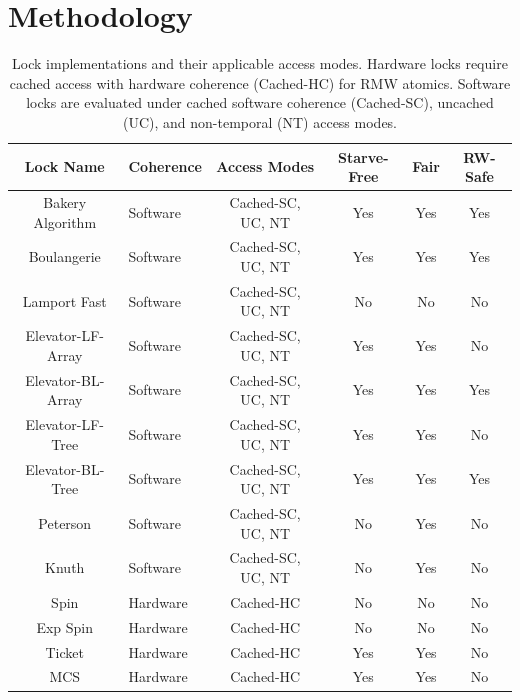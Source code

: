 \section{Methodology}

\begin{table}
    \centering
    \begin{tabular}{clcccc}
        \toprule
         Lock Name & Coherence & Access Modes & Starve-Free & Fair & RW-Safe \\
        \midrule
         Bakery Algorithm\cite{lamportNewSolutionDijkstras1974} & Software & Cached-SC, UC, NT & Yes & Yes & Yes\\
         Boulangerie\cite{mosesHoodBakeryAlgorithm2015} & Software & Cached-SC, UC, NT & Yes & Yes & Yes\\
         Lamport Fast\cite{lamportFastMutualExclusion1987} & Software & Cached-SC, UC, NT & No & No & No\\
         Elevator-LF-Array\cite{buhrHighcontentionMutualExclusion2018} & Software & Cached-SC, UC, NT & Yes & Yes & No\\
         Elevator-BL-Array\cite{buhrHighcontentionMutualExclusion2018} & Software & Cached-SC, UC, NT & Yes & Yes & Yes\\
         Elevator-LF-Tree\cite{buhrHighcontentionMutualExclusion2018} & Software & Cached-SC, UC, NT & Yes & Yes & No\\
         Elevator-BL-Tree\cite{buhrHighcontentionMutualExclusion2018} & Software & Cached-SC, UC, NT & Yes & Yes & Yes\\
         Peterson\cite{petersonMythsMutualExclusion1981} & Software & Cached-SC, UC, NT & No & Yes & No\\
         Knuth\cite{knuthAdditionalCommentsProblem1966} & Software & Cached-SC, UC, NT & No & Yes & No\\
         Spin\cite{andersonPerformanceSpinLock1990} & Hardware & Cached-HC & No & No & No\\
         Exp Spin\cite{andersonPerformanceSpinLock1990} & Hardware & Cached-HC & No & No & No\\
         Ticket\cite{mellor-crummeyAlgorithmsScalableSynchronization1991} & Hardware & Cached-HC & Yes & Yes & No\\
         MCS\cite{mellor-crummeyAlgorithmsScalableSynchronization1991} & Hardware & Cached-HC & Yes & Yes & No\\
         \bottomrule
    \end{tabular}
    \caption{Lock implementations and their applicable access modes. Hardware locks require cached access with hardware coherence (Cached-HC) for RMW atomics. Software locks are evaluated under cached software coherence (Cached-SC), uncached (UC), and non-temporal (NT) access modes.}
    \label{tab:Locks}
\end{table}

